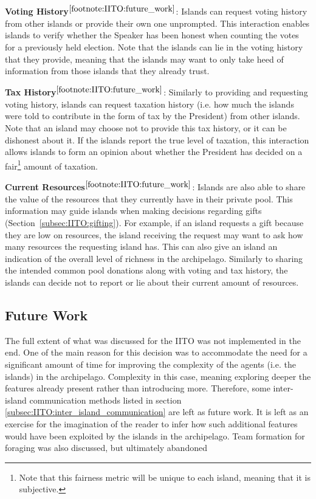 \textbf{Voting History$^{\ref{footnote:IITO:future_work}}$}: Islands can request voting history from other islands or provide their own one unprompted. This interaction enables islands to verify whether the Speaker has been honest when counting the votes for a previously held election. Note that the islands can lie in the voting history that they provide, meaning that the islands may want to only take heed of information from those islands that they already trust.

\textbf{Tax History$^{\ref{footnote:IITO:future_work}}$}: Similarly to providing and requesting voting history, islands can request taxation history (i.e. how much the islands were told to contribute in the form of tax by the President) from other islands. Note that an island may choose not to provide this tax history, or it can be dishonest about it. If the islands report the true level of taxation, this interaction allows islands to form an opinion about whether the President has decided on a fair\footnote{Note that this fairness metric will be unique to each island, meaning that it is subjective.} amount of taxation.

\textbf{Current Resources$^{\ref{footnote:IITO:future_work}}$}: Islands are also able to share the value of the resources that they currently have in their private pool. This information may guide islands when making decisions regarding gifts (Section~\ref{subsec:IITO:gifting}). For example, if an island requests a gift because they are low on resources, the island receiving the request may want to ask how many resources the requesting island has. This can also give an island an indication of the overall level of richness in the archipelago. Similarly to sharing the intended common pool donations along with voting and tax history, the islands can decide not to report or lie about their current amount of resources.

\subsection{Future Work}
\label{subsec:IITO:futurework}
The full extent of what was discussed for the IITO was not implemented in the end. One of the main reason for this decision was to accommodate the need for a significant amount of time for improving the complexity of the agents (i.e. the islands) in the archipelago. Complexity in this case, meaning exploring deeper the features already present rather than introducing more. Therefore, some inter-island communication methods listed in section \ref{subsec:IITO:inter_island_communication} are left as future work. It is left as an exercise for the imagination of the reader to infer how such additional features would have been exploited by the islands in the archipelago. Team formation for foraging was also discussed, but ultimately abandoned
